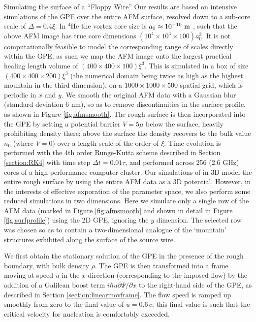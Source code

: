 \begin{chapter}{\label{cha:afm}Simulating the surface of a ``Floppy Wire''}
Our results are based on intensive simulations of the GPE over the entire AFM surface, resolved down to a sub-core scale of $\Delta=0.4\xi$. In $^4$He the vortex core size is $a_0 \approx 10^{-10}~\rm m$ \cite{Rayfield1964}, such that the above AFM image has true core dimensions $(10^4 \times 10^4 \times 100) a_0^3$.  It is not computationally feasible to model the corresponding range of scales directly within the GPE; as such we map the AFM image onto the largest practical healing length volume of $(400 \times 400 \times 100) \xi^3$.  This is simulated in a box of size $(400 \times 400 \times 200) \xi^3$ (the numerical domain being twice as high as the highest mountain in the third dimension), on a $1000\times 1000\times 500$ spatial grid, which is periodic in $x$ and $y$.  We smooth the original AFM data with a Gaussian blur (standard deviation 6 nm), so as to remove discontinuities in the surface profile, as shown in Figure \ref{fig:afmsmooth}. The rough surface is then incorporated into the GPE by setting a potential barrier $V=5\mu$ below the surface, heavily prohibiting density there; above the surface the density recovers to the bulk value $n_0$ (where $V=0$) over a length scale of the order of $\xi$. Time evolution is performed with the 4th order Runge-Kutta scheme described in Section \ref{section:RK4} with time step $\Delta t=0.01 \tau $, and performed across 256 (2.6 GHz) cores of a high-performance {computer} cluster. Our simulations of in 3D model the entire rough surface by using the entire AFM data as a 3D potential. However, in the interests of effective exporation of the parameter space, we also perform some reduced simulations in two dimensions. Here we simulate only a single row of the AFM data (marked in Figure \ref{fig:afmsmooth} and shown in detail in Figure \ref{fig:surfprofile}) using the 2D GPE, ignoring the $y$ dimension. The selected row was chosen so as to contain a two-dimensional analogue of the `mountain' structures exhibited along the surface of the source wire.

We first obtain the stationary solution of the GPE in the presence of
the rough boundary, with bulk density $\rho$.  The GPE is then transformed into a frame moving at speed $u$ in the $x$-direction (corresponding to the imposed flow) by the addition of a Galilean boost term $ i \hbar u \partial \Psi/\partial x$ to the right-hand side of the GPE, as described in Section \ref{section:linearmovframe}.  The flow speed {is}  ramped up smoothly from zero to the final value of $u=0.6\,c$; this final value is such that the critical velocity for nucleation is comfortably exceeded. 


\end{chapter}
